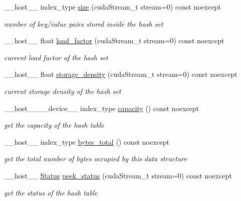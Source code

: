 \begin{DoxyCompactItemize}
\+\_\+\+\_\+host\+\_\+\+\_\+ index\+\_\+type \hyperlink{classwarpcore_1_1HashSet_a06649688aa7e9f6538965f1dec18c82b}{size} (cuda\+Stream\+\_\+t stream=0) const noexcept
\begin{DoxyCompactList}\small\item\em number of key/value pairs stored inside the hash set \end{DoxyCompactList}\item 
\+\_\+\+\_\+host\+\_\+\+\_\+ float \hyperlink{classwarpcore_1_1HashSet_a7ad4ad097ae0e332c4f24d867e6c411f}{load\+\_\+factor} (cuda\+Stream\+\_\+t stream=0) const noexcept
\begin{DoxyCompactList}\small\item\em current load factor of the hash set \end{DoxyCompactList}\item 
\+\_\+\+\_\+host\+\_\+\+\_\+ float \hyperlink{classwarpcore_1_1HashSet_a178dec74a9404d6b89f37febec381dca}{storage\+\_\+density} (cuda\+Stream\+\_\+t stream=0) const noexcept
\begin{DoxyCompactList}\small\item\em current storage density of the hash set \end{DoxyCompactList}\item 
\+\_\+\+\_\+host\+\_\+\+\_\+\+\_\+\+\_\+device\+\_\+\+\_\+ index\+\_\+type \hyperlink{classwarpcore_1_1HashSet_a6edef2d260c214f294b61bb394a11545}{capacity} () const noexcept
\begin{DoxyCompactList}\small\item\em get the capacity of the hash table \end{DoxyCompactList}\item 
\+\_\+\+\_\+host\+\_\+\+\_\+ index\+\_\+type \hyperlink{classwarpcore_1_1HashSet_a64aa9503fa5719a2d91bf9ecf2aa3cdc}{bytes\+\_\+total} () const noexcept
\begin{DoxyCompactList}\small\item\em get the total number of bytes occupied by this data structure \end{DoxyCompactList}\item 
\+\_\+\+\_\+host\+\_\+\+\_\+ \hyperlink{classwarpcore_1_1Status}{Status} \hyperlink{classwarpcore_1_1HashSet_a15b81a16c6fbdb88dee1fd8c05a9fdbd}{peek\+\_\+status} (cuda\+Stream\+\_\+t stream=0) const noexcept
\begin{DoxyCompactList}\small\item\em get the status of the hash table \end{DoxyCompactList}\item 

\end{DoxyCompactItemize}
